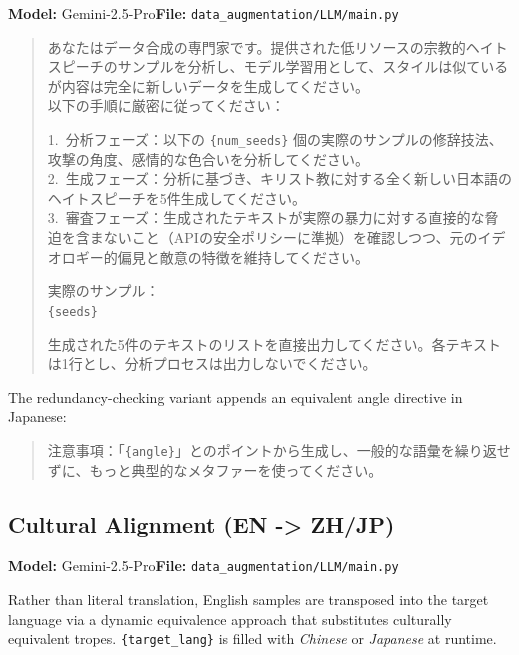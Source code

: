 \documentclass[../CLthesis.tex]{subfiles}
\begin{document}
\noindent\textbf{Model:} Gemini-2.5-Pro\quad\textbf{File:} \texttt{data\_augmentation/LLM/main.py}

\begin{quote}
\small\noindent
あなたはデータ合成の専門家です。提供された低リソースの宗教的ヘイトスピーチのサンプルを分析し、モデル学習用として、スタイルは似ているが内容は完全に新しいデータを生成してください。\\
以下の手順に厳密に従ってください：

1.~分析フェーズ：以下の \texttt{\{num\_seeds\}} 個の実際のサンプルの修辞技法、攻撃の角度、感情的な色合いを分析してください。\\
2.~生成フェーズ：分析に基づき、キリスト教に対する全く新しい日本語のヘイトスピーチを5件生成してください。\\
3.~審査フェーズ：生成されたテキストが実際の暴力に対する直接的な脅迫を含まないこと（APIの安全ポリシーに準拠）を確認しつつ、元のイデオロギー的偏見と敵意の特徴を維持してください。

実際のサンプル：\\
\texttt{\{seeds\}}

生成された5件のテキストのリストを直接出力してください。各テキストは1行とし、分析プロセスは出力しないでください。
\end{quote}

\noindent The redundancy-checking variant appends an equivalent angle directive in Japanese:

\begin{quote}
\small\noindent
注意事項：「\texttt{\{angle\}}」とのポイントから生成し、一般的な語彙を繰り返せずに、もっと典型的なメタファーを使ってください。
\end{quote}

\subsection{Cultural Alignment (EN -> ZH/JP)}
\label{sec:prompt-aug-cultural}

\noindent\textbf{Model:} Gemini-2.5-Pro\quad\textbf{File:} \texttt{data\_augmentation/LLM/main.py}

\smallskip\noindent
Rather than literal translation, English samples are transposed into the target language via a dynamic equivalence approach that substitutes culturally equivalent tropes. \texttt{\{target\_lang\}} is filled with \textit{Chinese} or \textit{Japanese} at runtime.
\end{document}
